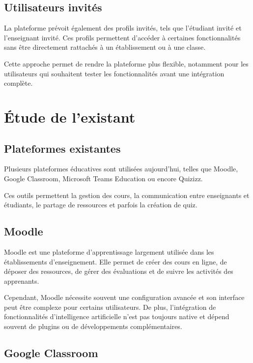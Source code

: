 \documentclass[12pt,a4paper]{report}
\begin{document}
\subsection{Utilisateurs invités}

La plateforme prévoit également des profils invités, tels que l'étudiant invité
et l'enseignant invité. Ces profils permettent d'accéder à certaines
fonctionnalités sans être directement rattachés à un établissement ou à une
classe.

Cette approche permet de rendre la plateforme plus flexible, notamment pour les
utilisateurs qui souhaitent tester les fonctionnalités avant une intégration
complète.

\section{Étude de l'existant}

\subsection{Plateformes existantes}

Plusieurs plateformes éducatives sont utilisées aujourd'hui, telles que Moodle, Google Classroom, Microsoft Teams Education ou encore Quizizz.

Ces outils permettent la gestion des cours, la communication entre enseignants et étudiants, le partage de ressources et parfois la création de quiz.

\subsection{Moodle}

Moodle est une plateforme d'apprentissage largement utilisée dans les
établissements d'enseignement. Elle permet de créer des cours en ligne, de
déposer des ressources, de gérer des évaluations et de suivre les activités des
apprenants.

Cependant, Moodle nécessite souvent une configuration avancée et son interface
peut être complexe pour certains utilisateurs. De plus, l'intégration de
fonctionnalités d'intelligence artificielle n'est pas toujours native et dépend
souvent de plugins ou de développements complémentaires.

\subsection{Google Classroom}
\end{document}
